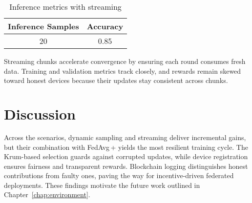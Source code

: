 \begin{table}[h!]
    \centering
    \caption{Inference metrics with streaming}
    \label{tab:streaming_inference}
    \begin{tabular}{c c}
        \toprule
        \textbf{Inference Samples} & \textbf{Accuracy} \\
        \midrule
        20 & 0.85 \\
        \bottomrule
    \end{tabular}
\end{table}

Streaming chunks accelerate convergence by ensuring each round consumes fresh data. Training and validation metrics track closely, and rewards remain skewed toward honest devices because their updates stay consistent across chunks.

\section{Discussion}

Across the scenarios, dynamic sampling and streaming deliver incremental gains, but their combination with FedAvg\,+ yields the most resilient training cycle. The Krum-based selection guards against corrupted updates, while device registration ensures fairness and transparent rewards. Blockchain logging distinguishes honest contributions from faulty ones, paving the way for incentive-driven federated deployments. These findings motivate the future work outlined in Chapter~\ref{chap:environment}.


